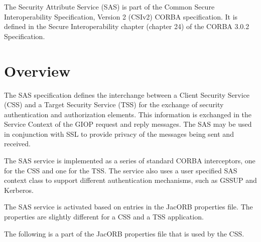 
The Security Attribute Service (SAS) is part of the Common Secure 
Interoperability Specification, Version 2 (CSIv2) CORBA specification.
It is defined in the Secure Interoperability chapter (chapter 24) of the
CORBA 3.0.2 Specification.

\section{Overview}

The SAS specification defines the interchange between a Client Security 
Service (CSS) and a Target Security Service (TSS)
for the exchange of security authentication and authorization
elements. This information is exchanged in the Service Context of the GIOP
request and reply messages. The SAS may be used in conjunction with SSL to
provide privacy of the messages being sent and received.

The SAS service is implemented as a series of standard CORBA interceptors,
one for the CSS and one for the TSS. The service also uses a user specified
SAS context class to support different authentication mechanisms, such as
GSSUP and Kerberos.

The SAS service is activated based on entries in the JacORB properties file.
The properties are slightly different for a CSS and a TSS application.

The following is a part of the JacORB properties file that is used by 
the CSS.

